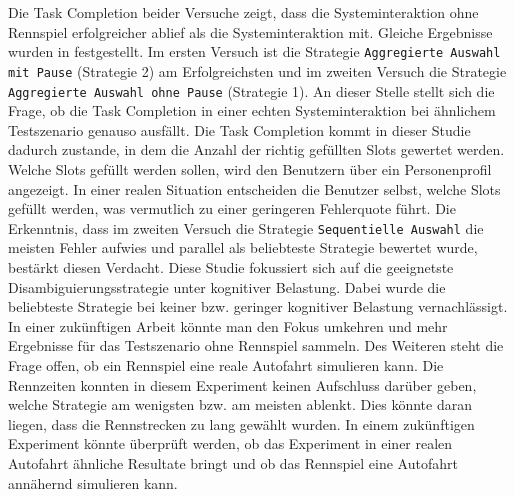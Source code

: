 \documentclass[12pt,a4paper]{scrartcl}
\begin{document}
Die Task Completion beider Versuche zeigt, dass die Systeminteraktion ohne Rennspiel erfolgreicher ablief als die Systeminteraktion mit. Gleiche Ergebnisse wurden in \cite{eCLDS} festgestellt. Im ersten Versuch ist die Strategie \texttt{Aggregierte Auswahl mit Pause} (Strategie 2) am Erfolgreichsten und im zweiten Versuch die Strategie \texttt{Aggregierte Auswahl ohne Pause} (Strategie 1). An dieser Stelle stellt sich die Frage, ob die Task Completion in einer echten Systeminteraktion bei ähnlichem Testszenario genauso ausfällt. Die Task Completion kommt in dieser Studie dadurch zustande, in dem die Anzahl der richtig gefüllten Slots gewertet werden. Welche Slots gefüllt werden sollen, wird den Benutzern über ein Personenprofil angezeigt. In einer realen Situation entscheiden die Benutzer selbst, welche Slots gefüllt werden, was vermutlich zu einer geringeren Fehlerquote führt. Die Erkenntnis, dass im zweiten Versuch die Strategie \texttt{Sequentielle Auswahl} die meisten Fehler aufwies und parallel als beliebteste Strategie bewertet wurde, bestärkt diesen Verdacht. 
\newline
\newline
Diese Studie fokussiert sich auf die geeignetste Disambiguierungsstrategie unter kognitiver Belastung. Dabei wurde die beliebteste Strategie bei keiner bzw. geringer kognitiver Belastung vernachlässigt. In einer zukünftigen Arbeit könnte man den Fokus umkehren und mehr Ergebnisse für das Testszenario ohne Rennspiel sammeln. 
Des Weiteren steht die Frage offen, ob ein Rennspiel eine reale Autofahrt simulieren kann. Die Rennzeiten konnten in diesem Experiment keinen Aufschluss darüber geben, welche Strategie am wenigsten bzw. am meisten ablenkt. Dies könnte daran liegen, dass die Rennstrecken zu lang gewählt wurden. In einem zukünftigen Experiment könnte überprüft werden, ob das Experiment in einer realen Autofahrt ähnliche Resultate bringt und ob das Rennspiel eine Autofahrt annähernd simulieren kann.
\end{document}
